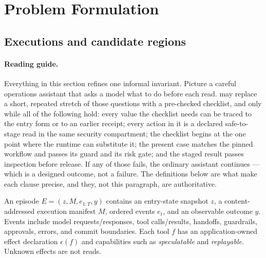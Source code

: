 \section{Problem Formulation}
\label{sec:problem}

\subsection{Executions and candidate regions}

\paragraph{Reading guide.}  Everything in this section refines one informal invariant.
Picture a careful operations assistant that asks a model what to do before each read.
\method may replace a short, repeated stretch of those questions with a pre-checked
checklist, and only while all of the following hold: every value the checklist needs can
be traced to the entry form or to an earlier receipt; every action in it is a declared
safe-to-stage read in the same security compartment; the checklist begins at the one
point where the runtime can substitute it; the present case matches the pinned workflow
and passes its guard and its risk gate; and the staged result passes inspection before
release.  If any of those fails, the ordinary assistant continues --- which is a designed
outcome, not a failure.  The definitions below are what make each clause precise, and
they, not this paragraph, are authoritative.

An episode $E=(z,M,e_{1:T},y)$ contains an entry-state snapshot $z$, a content-addressed
execution manifest $M$, ordered events $e_t$, and an observable outcome $y$.  Events
include model requests/responses, tool calls/results, handoffs, guardrails, approvals,
errors, and commit boundaries.  Each tool $f$ has an application-owned effect declaration
$\epsilon(f)$ and capabilities such as \emph{speculatable} and \emph{replayable}.
Unknown effects are not reads.

